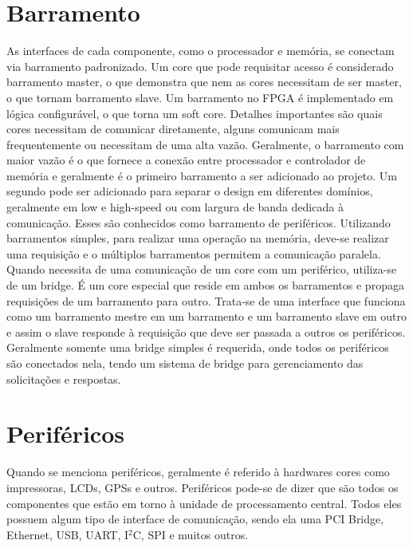 \section{Barramento}
As interfaces de cada componente, como o processador e memória, se conectam via barramento padronizado. Um core que pode requisitar acesso é considerado barramento master, o que demonstra que nem as cores necessitam de ser master, o que tornam barramento slave. Um barramento no FPGA é implementado em lógica configurável, o que torna um soft core. Detalhes importantes são quais cores necessitam de comunicar diretamente, alguns comunicam mais frequentemente ou necessitam de uma alta vazão.
Geralmente, o barramento com maior vazão é o que fornece a conexão entre processador e controlador de memória e geralmente é o primeiro barramento a ser adicionado ao projeto. Um segundo pode ser adicionado para separar o design em diferentes domínios, geralmente em low e high-speed ou com largura de banda dedicada à comunicação. Esses são conhecidos como barramento de periféricos. Utilizando barramentos simples, para realizar uma operação na memória, deve-se realizar uma requisição e o múltiplos barramentos permitem a comunicação paralela.
Quando necessita de uma comunicação de um core com um periférico, utiliza-se de um bridge. É um core especial que reside em ambos os barramentos e propaga requisições de um barramento para outro. Trata-se de uma interface que funciona como um barramento mestre em um barramento e um barramento slave em outro e assim o slave responde à requisição que deve ser passada a outros os periféricos. Geralmente somente uma bridge simples é requerida, onde todos os periféricos são conectados nela, tendo um sistema de bridge para gerenciamento das solicitações e respostas.


\section{Periféricos}
Quando se menciona periféricos, geralmente é referido à hardwares cores como impressoras, LCDs, GPSs e outros. Periféricos pode-se de dizer que são todos os componentes que estão em torno à unidade de processamento central. Todos eles possuem algum tipo de interface de comunicação, sendo ela uma PCI Bridge, Ethernet, USB, UART, I$^2$C, SPI e muitos outros.



